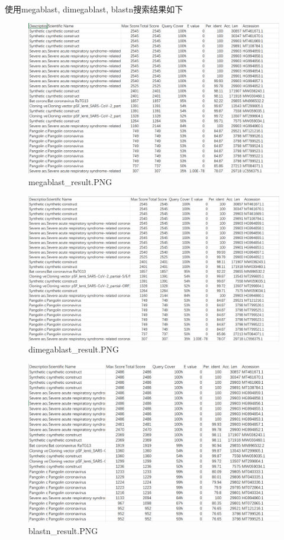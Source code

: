 \documentclass[supercite]{HustGraduPaper}
\begin{document}
	  \paragraph{}\label{subpara:subpara}使用megablast, dimegablast, blastn搜索结果如下
		\begin{figure}[H]
			\centering
			\includegraphics[width=1\textwidth]{./material/practice1/megablast_result.png}
			\caption{megablast\_result.PNG}
		\end{figure}
		\begin{figure}[H]
			\centering
			\includegraphics[width=1\textwidth]{./material/practice1/dimegablast_result.png}
			\caption{dimegablast\_result.PNG}
		\end{figure}
		\begin{figure}[H]
			\centering
			\includegraphics[width=1\textwidth]{./material/practice1/blastn_result.png}
			\caption{blastn\_result.PNG}
		\end{figure}
\end{document}
